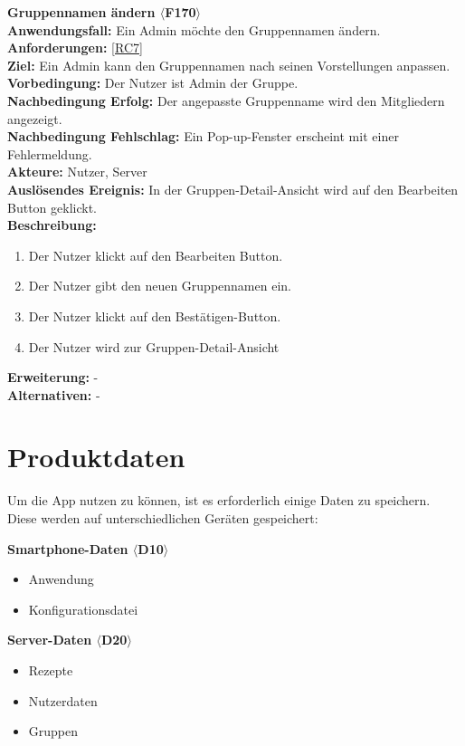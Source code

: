 \documentclass[parskip=full]{scrartcl}
\begin{document}
\textbf{Gruppennamen ändern $\langle$F170$\rangle$}\\
\textbf{Anwendungsfall:} Ein Admin möchte den Gruppennamen ändern.\\
\textbf{Anforderungen:} \ref{RC7}\\
\textbf{Ziel:} Ein Admin kann den Gruppennamen nach seinen Vorstellungen anpassen.\\
\textbf{Vorbedingung:} Der Nutzer ist Admin der Gruppe.\\
\textbf{Nachbedingung Erfolg:} Der angepasste Gruppenname wird den Mitgliedern angezeigt.\\
\textbf{Nachbedingung Fehlschlag:} Ein Pop-up-Fenster erscheint mit einer Fehlermeldung.\\
\textbf{Akteure:} Nutzer, Server \\
\textbf{Auslösendes Ereignis:} In der Gruppen-Detail-Ansicht wird auf den Bearbeiten Button geklickt.\\
\textbf{Beschreibung:}
\begin{enumerate}
    \item Der Nutzer klickt auf den Bearbeiten Button.
    \item Der Nutzer gibt den neuen Gruppennamen ein.
    \item Der Nutzer klickt auf den Bestätigen-Button.
    \item Der Nutzer wird zur Gruppen-Detail-Ansicht
\end{enumerate}
\textbf{Erweiterung:} -\\
\textbf{Alternativen:} -
\newpage

\section{Produktdaten}
Um die App nutzen zu können, ist es erforderlich einige Daten zu speichern. Diese werden auf unterschiedlichen Geräten gespeichert:

\textbf{Smartphone-Daten $\langle$D10$\rangle$}
\begin{itemize}
    \item Anwendung
    \item Konfigurationsdatei
\end{itemize}

\textbf{Server-Daten $\langle$D20$\rangle$}
\begin{itemize}
    \item Rezepte
    \item Nutzerdaten
    \item Gruppen
\end{itemize}
\end{document}
